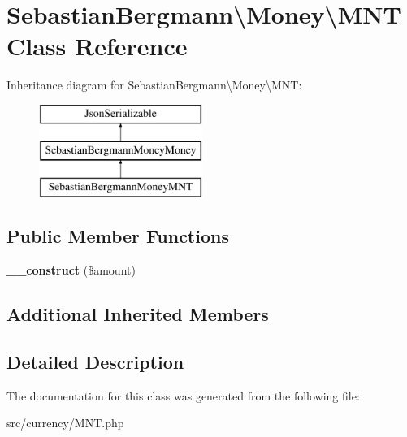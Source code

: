 \hypertarget{classSebastianBergmann_1_1Money_1_1MNT}{}\section{Sebastian\+Bergmann\textbackslash{}Money\textbackslash{}M\+N\+T Class Reference}
\label{classSebastianBergmann_1_1Money_1_1MNT}
Inheritance diagram for Sebastian\+Bergmann\textbackslash{}Money\textbackslash{}M\+N\+T\+:\begin{figure}[H]
\begin{center}
\leavevmode
\includegraphics[height=3.000000cm]{classSebastianBergmann_1_1Money_1_1MNT}
\end{center}
\end{figure}
\subsection*{Public Member Functions}
\begin{DoxyCompactItemize}
\item 
\hypertarget{classSebastianBergmann_1_1Money_1_1MNT_a0c31f7155e68d0acaa282846475159ef}{}{\bfseries \+\_\+\+\_\+construct} (\$amount)\label{classSebastianBergmann_1_1Money_1_1MNT_a0c31f7155e68d0acaa282846475159ef}

\end{DoxyCompactItemize}
\subsection*{Additional Inherited Members}


\subsection{Detailed Description}


The documentation for this class was generated from the following file\+:\begin{DoxyCompactItemize}
\item 
src/currency/M\+N\+T.\+php\end{DoxyCompactItemize}
